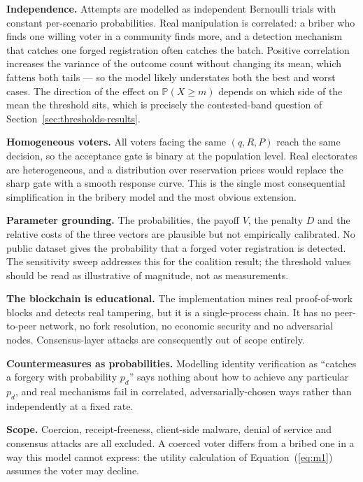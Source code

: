 \documentclass[11pt,a4paper]{article}
\newcommand{\Prob}{\mathbb{P}}
\newcommand{\eqnref}[1]{Equation~(\ref{#1})}
\begin{document}
\textbf{Independence.} Attempts are modelled as independent Bernoulli trials with
constant per-scenario probabilities. Real manipulation is correlated: a briber who finds
one willing voter in a community finds more, and a detection mechanism that catches one
forged registration often catches the batch. Positive correlation increases the variance
of the outcome count without changing its mean, which fattens both tails --- so the
model likely understates both the best and worst cases. The direction of the effect on
$\Prob(X \geq m)$ depends on which side of the mean the threshold sits, which is
precisely the contested-band question of Section~\ref{sec:thresholds-results}.

\textbf{Homogeneous voters.} All voters facing the same $(q, R, P)$ reach the same
decision, so the acceptance gate is binary at the population level. Real electorates are
heterogeneous, and a distribution over reservation prices would replace the sharp gate
with a smooth response curve. This is the single most consequential simplification in
the bribery model and the most obvious extension.

\textbf{Parameter grounding.} The probabilities, the payoff $V$, the penalty $D$ and the
relative costs of the three vectors are plausible but not empirically calibrated. No
public dataset gives the probability that a forged voter registration is detected. The
sensitivity sweep addresses this for the coalition result; the threshold values should
be read as illustrative of magnitude, not as measurements.

\textbf{The blockchain is educational.} The implementation mines real proof-of-work
blocks and detects real tampering, but it is a single-process chain. It has no peer-to-peer
network, no fork resolution, no economic security and no adversarial nodes.
Consensus-layer attacks are consequently out of scope entirely.

\textbf{Countermeasures as probabilities.} Modelling identity verification as
``catches a forgery with probability $p_d$'' says nothing about how to achieve any
particular $p_d$, and real mechanisms fail in correlated, adversarially-chosen ways
rather than independently at a fixed rate.

\textbf{Scope.} Coercion, receipt-freeness, client-side malware, denial of service and
consensus attacks are all excluded. A coerced voter differs from a bribed one in a way
this model cannot express: the utility calculation of \eqnref{eq:m1} assumes the voter
may decline.
\end{document}
